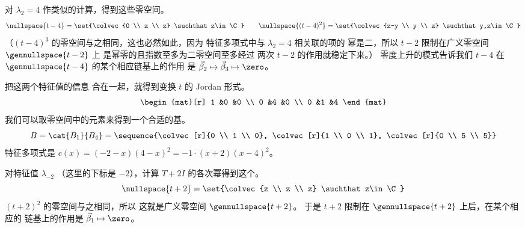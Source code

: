 \begin{exercises}
\begin{answer}
\begin{exparts}
            对 $\lambda_2=4$ 作类似的计算，得到这些零空间。
            \begin{equation*}
              \nullspace{t-4}=\set{\colvec{0 \\ z \\ z}
                                      \suchthat z\in\C}
              \qquad
              \nullspace{(t-4)^2}=\set{\colvec{z-y \\ y \\ z}
                                          \suchthat y,z\in\C}
            \end{equation*}
            （$(t-4)^3$ 的零空间与之相同，这也必然如此，因为
            特征多项式中与 $\lambda_2=4$ 相关联的项的
            幂是二，所以
            $t-2$ 限制在广义零空间 $\gennullspace{t-2}$ 上
            是幂零的且指数至多为二\Dash 零空间至多经过
            两次 $t-2$ 的作用就稳定下来。）
            零度上升的模式告诉我们
             $t-4$ 在 $\gennullspace{t-4}$ 的某个相应链基上的作用
            是
            $\vec{\beta}_2\mapsto\vec{\beta}_3\mapsto\zero$。

            把这两个特征值的信息
            合在一起，就得到变换 $t$ 的 Jordan 形式。
            \begin{equation*}
              \begin{mat}[r]
                1  &0  &0  \\
                0  &4  &0  \\
                0  &1  &4
              \end{mat}
            \end{equation*}
            我们可以取零空间中的元素来得到一个合适的基。
            \begin{equation*}
              B=\cat{B_{1}}{B_4}=
               \sequence{\colvec[r]{0 \\ 1 \\ 0},
                          \colvec[r]{1 \\ 0 \\ 1},
                          \colvec[r]{0 \\ 5 \\ 5}}
            \end{equation*}
        \partsitem 特征多项式是
            \( c(x)=(-2-x)(4-x)^2=-1\cdot (x+2)(x-4)^2 \)。

            对特征值 $\lambda_{-2}$
            （这里的下标是 \( -2\)），计算
            $T+2I$ 的各次幂得到这个。
            \begin{equation*}
              \nullspace{t+2}=\set{\colvec{z \\ z \\ z}
                                      \suchthat z\in\C}
            \end{equation*}
            $(t+2)^2$ 的零空间与之相同，所以 
            这就是广义零空间 $\gennullspace{t+2}$。
            于是 $t+2$ 限制在 
            $\gennullspace{t+2}$ 上后，在某个相应的
            链基上的作用是 $\vec{\beta}_1\mapsto\zero$。


\end{exparts}
\end{answer}
\end{exercises}
